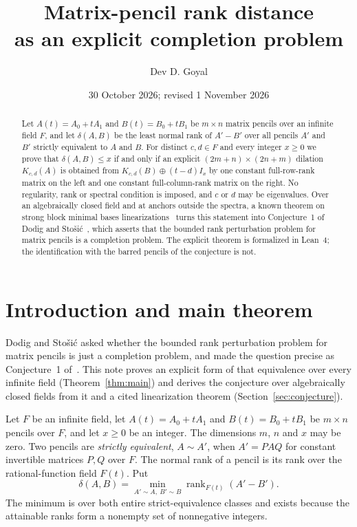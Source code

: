 \documentclass[11pt]{article}
\title{\textbf{Matrix-pencil rank distance\\as an explicit completion problem}}
\author{Dev D. Goyal}
\date{30 October 2026; revised 1 November 2026}
\newcommand{\rk}{\operatorname{rank}}
\newcommand{\Ft}{F(t)}
\begin{document}
\maketitle

\begin{abstract}
Let $A(t)=A_0+tA_1$ and $B(t)=B_0+tB_1$ be $m\times n$ matrix pencils over an infinite field $F$, and let $\delta(A,B)$ be the least normal rank of $A'-B'$ over all pencils $A'$ and $B'$ strictly equivalent to $A$ and $B$. For distinct $c,d\in F$ and every integer $x\ge0$ we prove that $\delta(A,B)\le x$ if and only if an explicit $(2m+n)\times(2n+m)$ dilation $K_{c,d}(A)$ is obtained from $K_{c,d}(B)\oplus(t-d)I_x$ by one constant full-row-rank matrix on the left and one constant full-column-rank matrix on the right. No regularity, rank or spectral condition is imposed, and $c$ or $d$ may be eigenvalues. Over an algebraically closed field and at anchors outside the spectra, a known theorem on strong block minimal bases linearizations~\cite{DLPV18} turns this statement into Conjecture~1 of Dodig and Sto\v{s}i\'c~\cite{DS25}, which asserts that the bounded rank perturbation problem for matrix pencils is a completion problem. The explicit theorem is formalized in Lean~4; the identification with the barred pencils of the conjecture is not.
\end{abstract}

\section{Introduction and main theorem}\label{sec:theorem}

Dodig and Sto\v{s}i\'c asked whether the bounded rank perturbation problem for matrix pencils is just a completion problem, and made the question precise as Conjecture~1 of~\cite{DS25}. This note proves an explicit form of that equivalence over every infinite field (Theorem~\ref{thm:main}) and derives the conjecture over algebraically closed fields from it and a cited linearization theorem (Section~\ref{sec:conjecture}).

Let $F$ be an infinite field, let $A(t)=A_0+tA_1$ and $B(t)=B_0+tB_1$ be $m\times n$ pencils over $F$, and let $x\ge0$ be an integer. The dimensions $m$, $n$ and $x$ may be zero. Two pencils are \emph{strictly equivalent}, $A\sim A'$, when $A'=PAQ$ for constant invertible matrices $P,Q$ over $F$. The normal rank of a pencil is its rank over the rational-function field $\Ft$. Put
\[
\delta(A,B)=\min_{A'\sim A,\ B'\sim B}\rk_{\Ft}(A'-B').
\]
The minimum is over both entire strict-equivalence classes and exists because the attainable ranks form a nonempty set of nonnegative integers.
\end{document}
